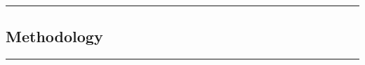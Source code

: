 {\color{gray}\hrule}
\begin{center}
\section{Methodology}

\bigskip
\end{center}
{\color{gray}\hrule}

